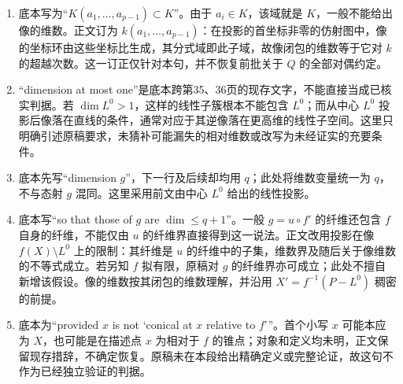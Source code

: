 \begin{enumerate}
\item 底本写为“$K(a_1,\ldots,a_{p-1})\subset K$”。由于 $a_i\in K$，该域就是 $K$，一般不能给出像的维数。正文订为 $k(a_1,\ldots,a_{p-1})$：在投影的首坐标非零的仿射图中，像的坐标环由这些坐标比生成，其分式域即此子域，故像闭包的维数等于它对 $k$ 的超越次数。这一订正仅针对本句，并不恢复前批关于 $Q$ 的全部对偶约定。

\item “dimension at most one”是底本跨第35、36页的现存文字，不能直接当成已核实判据。若 $\dim L^0>1$，这样的线性子簇根本不能包含 $L^0$；而从中心 $L^0$ 投影后像落在直线的条件，通常对应于其逆像落在更高维的线性子空间。这里只明确引述原稿要求，未猜补可能漏失的相对维数或改写为未经证实的充要条件。

\item 底本先写“dimension $g$”，下一行及后续却均用 $q$；此处将维数变量统一为 $q$，不与态射 $g$ 混同。这里采用前文由中心 $L^0$ 给出的线性投影。

\item 底本写“so that those of $g$ are $\dim\le q+1$”。一般 $g=u\circ f'$ 的纤维还包含 $f$ 自身的纤维，不能仅由 $u$ 的纤维界直接得到这一说法。正文改用投影在像 $f(X)\setminus L^0$ 上的限制：其纤维是 $u$ 的纤维中的子集，维数界及随后关于像维数的不等式成立。若另知 $f$ 拟有限，原稿对 $g$ 的纤维界亦可成立；此处不擅自新增该假设。像的维数按其闭包的维数理解，并沿用 $X'=f^{-1}(P-L^0)$ 稠密的前提。

\item 底本为“provided $x$ is not ‘conical at $x$ relative to $f$’”。首个小写 $x$ 可能本应为 $X$，也可能是在描述点 $x$ 为相对于 $f$ 的锥点；对象和定义均未明，正文保留现存措辞，不确定恢复。原稿未在本段给出精确定义或完整论证，故这句不作为已经独立验证的判据。

\end{enumerate}
\par
\endgroup
